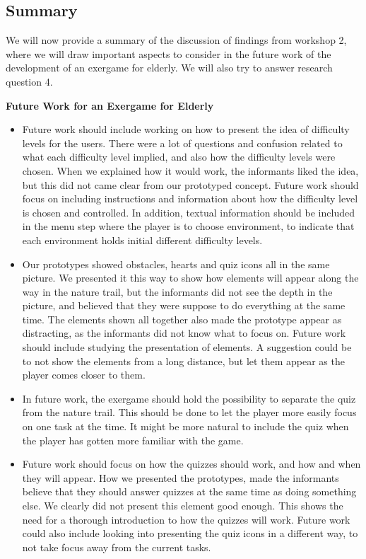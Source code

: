 \subsection{Summary}
We will now provide a summary of the discussion of findings from workshop 2, where we will draw important aspects to consider in the future work of the development of an exergame for elderly. We will also try to answer research question 4.

\textbf{Future Work for an Exergame for Elderly}
\begin{itemize}
\renewcommand{\labelitemi}{$\bullet$}
\item Future work should include working on how to present the idea of difficulty levels for the users. There were a lot of questions and confusion related to what each difficulty level implied, and also how the difficulty levels were chosen. When we explained how it would work, the informants liked the idea, but this did not came clear from our prototyped concept. Future work should focus on including instructions and information about how the difficulty level is chosen and controlled. In addition, textual information should be included in the menu step where the player is to choose environment, to indicate that each environment holds initial different difficulty levels.  
\item Our prototypes showed obstacles, hearts and quiz icons all in the same picture. We presented it this way to show how elements will appear along the way in the nature trail, but the informants did not see the depth in the picture, and believed that they were suppose to do everything at the same time. The elements shown all together also made the prototype appear as distracting, as the informants did not know what to focus on. Future work should include studying the presentation of elements. A suggestion could be to not show the elements from a long distance, but let them appear as the player comes closer to them. 
\item In future work, the exergame should hold the possibility to separate the quiz from the nature trail. This should be done to let the player more easily focus on one task at the time. It might be more natural to include the quiz when the player has gotten more familiar with the game.
\item Future work should focus on how the quizzes should work, and how and when they will appear. How we presented the prototypes, made the informants believe that they should answer quizzes at the same time as doing something else. We clearly did not present this element good enough. This shows the need for a thorough introduction to how the quizzes will work. Future work could also include looking into presenting the quiz icons in a different way, to not take focus away from the current tasks. 

\end{itemize}
